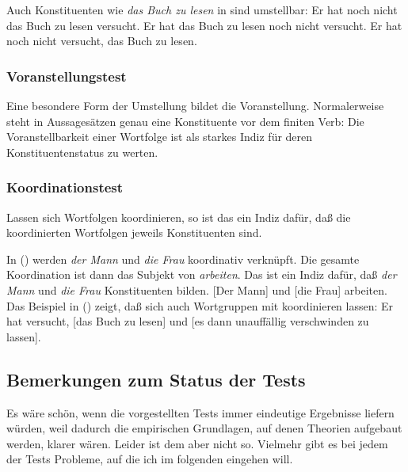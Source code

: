 \noindent
Auch Konstituenten wie \emph{das Buch zu lesen} in 
sind umstellbar:
\eal
\ex Er hat noch nicht das Buch zu lesen versucht.
\ex Er hat das Buch zu lesen noch nicht versucht.
\ex Er hat noch nicht versucht, das Buch zu lesen.
\zl
{}

\subsubsection{Voranstellungstest}

Eine besondere Form der Umstellung bildet die Voranstellung. Normalerweise steht
in Aussagesätzen genau eine Konstituente vor dem finiten Verb:
\eal
\label{bsp-v2}
\zl
Die Voranstellbarkeit einer Wortfolge ist als starkes Indiz für deren Konstituentenstatus
zu werten.

\subsubsection{Koordinationstest}

Lassen sich Wortfolgen koordinieren, so ist das ein Indiz dafür, daß die koordinierten Wortfolgen
jeweils Konstituenten sind.

In () werden \emph{der Mann} und \emph{die Frau} koordinativ verknüpft.
Die gesamte Koordination ist dann das Subjekt von \emph{arbeiten}.
Das ist ein Indiz dafür, daß \emph{der Mann}
und \emph{die Frau} Konstituenten bilden.
\ea
{}[Der Mann] und [die Frau] arbeiten.
\z
Das Beispiel in () zeigt, daß sich auch Wortgruppen mit \zui koordinieren lassen:
\ea
Er hat versucht, [das Buch zu lesen] und [es dann unauffällig verschwinden zu lassen].
\z

\subsection{Bemerkungen zum Status der Tests}
\label{sec-status-der-ktests}

Es wäre schön, wenn die vorgestellten Tests immer eindeutige Ergebnisse liefern würden,
weil dadurch die empirischen Grundlagen, auf denen Theorien aufgebaut werden, klarer
wären. Leider ist dem aber nicht so. Vielmehr gibt es bei jedem der Tests Probleme,
auf die ich im folgenden eingehen will.

